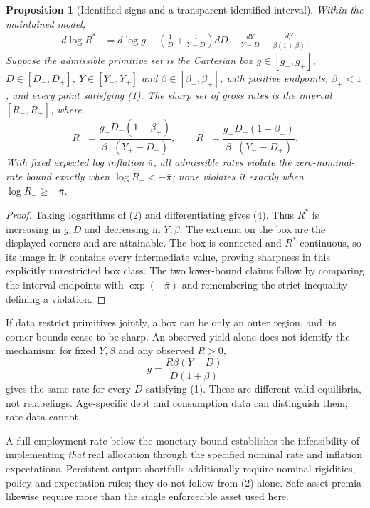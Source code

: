 \documentclass[11pt]{article}
\newtheorem{proposition}[theorem]{Proposition}
\theoremstyle{remark}
\newcommand{\R}{\mathbb R}
\begin{document}
\begin{proposition}[Identified signs and a transparent identified interval]
Within the maintained model,
\begin{align*}
 d\log R^*&=d\log g+
 \left(\frac1D+\frac1{Y-D}\right)dD
 -\frac{dY}{Y-D}-\frac{d\beta}{\beta(1+\beta)}.                    \tag{4}
\end{align*}
Suppose the admissible primitive set is the Cartesian box
$g\in[g_-,g_+]$, $D\in[D_-,D_+]$, $Y\in[Y_-,Y_+]$ and
$\beta\in[\beta_-,\beta_+]$, with positive endpoints, $\beta_+<1$,
and every point satisfying (1). The sharp set of gross rates is the
interval $[R_-,R_+]$, where
\[
 R_- =\frac{g_-D_-(1+\beta_+)}{\beta_+(Y_+-D_-)},\qquad
 R_+ =\frac{g_+D_+(1+\beta_-)}{\beta_-(Y_--D_+)}.                  \tag{5}
\]
With fixed expected log inflation $\bar\pi$, all admissible rates violate
the zero-nominal-rate bound exactly when $\log R_+<-\bar\pi$; none
violates it exactly when $\log R_-\geq-\bar\pi$.
\end{proposition}
\begin{proof}
Taking logarithms of (2) and differentiating gives (4). Thus $R^*$ is
increasing in $g,D$ and decreasing in $Y,\beta$. The extrema on the box
are the displayed corners and are attainable. The box is connected and
$R^*$ continuous, so its image in $\R$ contains every intermediate
value, proving sharpness in this explicitly unrestricted box class.
The two lower-bound claims follow by comparing the interval endpoints
with $\exp(-\bar\pi)$ and remembering the strict inequality defining a
violation.
\end{proof}
If data restrict primitives jointly, a box can be only an outer region,
and its corner bounds cease to be sharp. An observed yield alone does not
identify the mechanism: for fixed $Y,\beta$ and any observed $R>0$,
\[
 g=\frac{R\beta(Y-D)}{D(1+\beta)}                                 \tag{6}
\]
gives the same rate for every $D$ satisfying (1). These are different
valid equilibria, not relabelings. Age-specific debt and consumption data
can distinguish them; rate data cannot.

A full-employment rate below the monetary bound establishes the
infeasibility of implementing \emph{that} real allocation through the
specified nominal rate and inflation expectations. Persistent output
shortfalls additionally require nominal rigidities, policy and expectation
rules; they do not follow from (2) alone. Safe-asset premia likewise require
more than the single enforceable asset used here.
\end{document}
